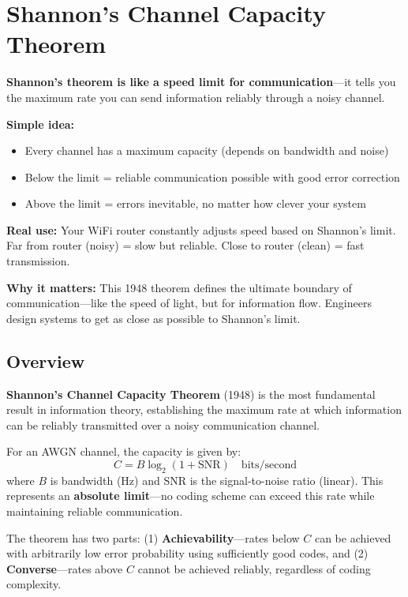 \chapter{Shannon's Channel Capacity Theorem}
\label{ch:shannon-capacity}

\begin{nontechnical}
\textbf{Shannon's theorem is like a speed limit for communication}---it tells you the maximum rate you can send information reliably through a noisy channel.

\textbf{Simple idea:}
\begin{itemize}
\item Every channel has a maximum capacity (depends on bandwidth and noise)
\item Below the limit = reliable communication possible with good error correction
\item Above the limit = errors inevitable, no matter how clever your system
\end{itemize}

\textbf{Real use:} Your WiFi router constantly adjusts speed based on Shannon's limit. Far from router (noisy) = slow but reliable. Close to router (clean) = fast transmission.

\textbf{Why it matters:} This 1948 theorem defines the ultimate boundary of communication---like the speed of light, but for information flow. Engineers design systems to get as close as possible to Shannon's limit.
\end{nontechnical}

\section{Overview}

\textbf{Shannon's Channel Capacity Theorem} (1948) is the most fundamental result in information theory, establishing the maximum rate at which information can be reliably transmitted over a noisy communication channel.

\begin{keyconcept}
For an AWGN channel, the capacity is given by:
\[
C = B \log_2(1 + \mathrm{SNR}) \quad \text{bits/second}
\]
where $B$ is bandwidth (Hz) and SNR is the signal-to-noise ratio (linear). This represents an \textbf{absolute limit}---no coding scheme can exceed this rate while maintaining reliable communication.
\end{keyconcept}

The theorem has two parts: (1) \textbf{Achievability}---rates below $C$ can be achieved with arbitrarily low error probability using sufficiently good codes, and (2) \textbf{Converse}---rates above $C$ cannot be achieved reliably, regardless of coding complexity.

